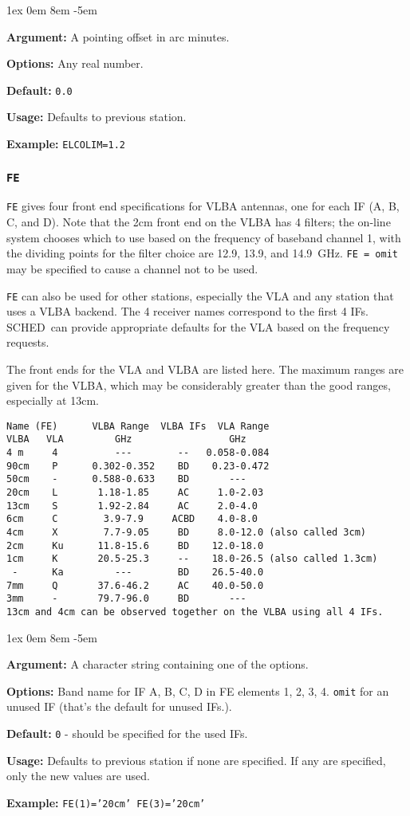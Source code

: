 \documentclass{report}
\newcommand{\schedb}{{\sc SCHED~}}
\newcommand{\rcwbox}[5]{
  \begin{list}{}{\parsep 1ex  \itemsep 0em
                 \leftmargin 8em  \itemindent -5em }
    \item {\bf Argument:} #1
    \item {\bf Options:}  #2
    \item {\bf Default:}  #3
    \item {\bf Usage:}    #4
    \item {\bf Example:}  #5
  \end{list}
}
\begin{document}
\rcwbox
{A pointing offset in arc minutes.}
{Any real number.}
{{\tt 0.0}}
{Defaults to previous station.}
{{\tt ELCOLIM=1.2}}



\subsubsection{\label{SP:FE}{\tt FE}}

{\tt FE} gives four front end specifications for VLBA antennas, one
for each IF (A, B, C, and D). Note that the 2cm front end on the VLBA
has 4 filters; the on-line system chooses which to use based on the
frequency of baseband channel 1, with the dividing points for the
filter choice are 12.9, 13.9, and 14.9~GHz.  {\tt FE = omit} may
be specified to cause a channel not to be used.

{\tt FE} can also be used for other stations, especially the VLA and
any station that uses a VLBA backend.  The 4 receiver names correspond
to the first 4 IFs.  \schedb can provide appropriate defaults for the
VLA based on the frequency requests.

The front ends for the VLA and VLBA are listed here.  The maximum
ranges are given for the VLBA, which may be considerably greater than
the good ranges, especially at 13cm.

\begin{verbatim}
Name (FE)      VLBA Range  VLBA IFs  VLA Range   
VLBA   VLA         GHz                 GHz
4 m     4          ---        --   0.058-0.084  
90cm    P      0.302-0.352    BD    0.23-0.472   
50cm    -      0.588-0.633    BD       ---
20cm    L       1.18-1.85     AC     1.0-2.03     
13cm    S       1.92-2.84     AC     2.0-4.0    
6cm     C        3.9-7.9     ACBD    4.0-8.0      
4cm     X        7.7-9.05     BD     8.0-12.0 (also called 3cm)
2cm     Ku      11.8-15.6     BD    12.0-18.0    
1cm     K       20.5-25.3     --    18.0-26.5 (also called 1.3cm)
 -      Ka         ---        BD    26.5-40.0    
7mm     Q       37.6-46.2     AC    40.0-50.0    
3mm     -       79.7-96.0     BD       ---
13cm and 4cm can be observed together on the VLBA using all 4 IFs.
\end{verbatim}

\rcwbox
{A character string containing one of the options.}
{Band name for IF A, B, C, D in FE elements 1, 2, 3, 4.  {\tt omit}
for an unused IF (that's the default for unused IFs.).}
{{\tt 0} - should be specified for the used IFs.}
{Defaults to previous station if none are specified.  If any are
specified, only the new values are used.}
{{\tt FE(1)='20cm' FE(3)='20cm'}}
\end{document}
